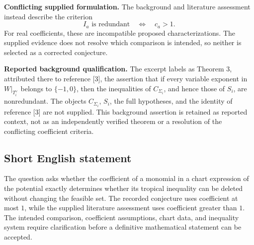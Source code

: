 \documentclass[11pt]{article}
\begin{document}
\textbf{Conflicting supplied formulation.} The background and literature assessment instead describe the criterion
\[
I_a\text{ is redundant}\quad\Longleftrightarrow\quad c_a>1.
\]
For real coefficients, these are incompatible proposed characterizations. The supplied evidence does not resolve which comparison is intended, so neither is selected as a corrected conjecture.

\textbf{Reported background qualification.} The excerpt labels as Theorem 3, attributed there to reference [3], the assertion that if every variable exponent in \(W|_{T_i^\vee}\) belongs to \(\{-1,0\}\), then the inequalities of \(C_{\Sigma_i}\), and hence those of \(S_i\), are nonredundant. The objects \(C_{\Sigma_i}\), \(S_i\), the full hypotheses, and the identity of reference [3] are not supplied. This background assertion is retained as reported context, not as an independently verified theorem or a resolution of the conflicting coefficient criteria.
\subsection{Short English statement}
The question asks whether the coefficient of a monomial in a chart expression of the potential exactly determines whether its tropical inequality can be deleted without changing the feasible set. The recorded conjecture uses coefficient at most \(1\), while the supplied literature assessment uses coefficient greater than \(1\). The intended comparison, coefficient assumptions, chart data, and inequality system require clarification before a definitive mathematical statement can be accepted.
\end{document}
